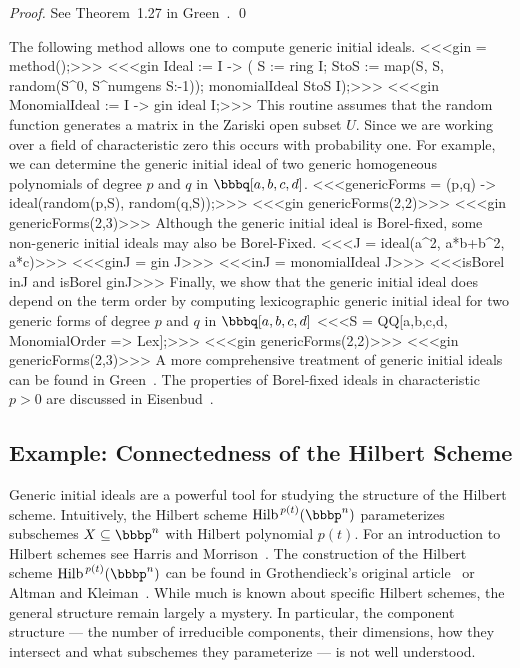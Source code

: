 \begin{proof}
See Theorem~1.27 in Green~\cite{MR99m:13040}. \qed
\end{proof}

The following method allows one to compute generic initial ideals.
<<<gin = method();>>>
<<<gin Ideal := I -> (
     S := ring I;
     StoS := map(S, S, random(S^{0}, S^{numgens S:-1}));
     monomialIdeal StoS I);>>>
<<<gin MonomialIdeal := I -> gin ideal I;>>>
This routine assumes that the random function generates a matrix in
the Zariski open subset $U$.  Since we are working over a field of
characteristic zero this occurs with probability one.
For example, we can determine the generic initial ideal of two generic
homogeneous polynomials of degree $p$ and $q$ in $\bbbq[a,b,c,d]$.
<<<genericForms = (p,q) -> ideal(random(p,S), random(q,S));>>>
<<<gin genericForms(2,2)>>>
<<<gin genericForms(2,3)>>>
Although the generic initial ideal is Borel-fixed, some non-generic
initial ideals may also be Borel-Fixed.
<<<J = ideal(a^2, a*b+b^2, a*c)>>>
<<<ginJ = gin J>>>
<<<inJ = monomialIdeal J>>>
<<<isBorel inJ and isBorel ginJ>>>
Finally, we show that the generic initial ideal does depend on the
term order by computing lexicographic generic initial ideal for two
generic forms of degree $p$ and $q$ in $\bbbq[a,b,c,d]$
<<<S = QQ[a,b,c,d, MonomialOrder => Lex];>>>
<<<gin genericForms(2,2)>>>
<<<gin genericForms(2,3)>>>
A more comprehensive treatment of generic initial ideals can be found
in Green~\cite{MR99m:13040}.  The properties of Borel-fixed ideals in
characteristic $p>0$ are discussed in Eisenbud~\cite{MR97a:13001}.


\subsection*{Example: Connectedness of the Hilbert Scheme}

Generic initial ideals are a powerful tool for studying the structure
of the Hilbert scheme.  Intuitively, the Hilbert
scheme $\Hilb^{\, p(t)}(\bbbp^{n})$ parameterizes subschemes $X
\subseteq \bbbp^{n}$ with Hilbert polynomial $p(t)$.  For an
introduction to Hilbert schemes see Harris and
Morrison~\cite{MR99g:14031}.  The construction of the Hilbert scheme $\Hilb^{\,
p(t)}(\bbbp^{n})$ can be found in Grothendieck's original
article~\cite{MR26:3566} or Altman and Kleiman~\cite{MR81f:14025a}.
While much is known about specific Hilbert schemes, the general
structure remain largely a mystery.  In particular, the component
structure --- the number of irreducible components, their dimensions,
how they intersect and what subschemes they parameterize --- is not
well understood.

